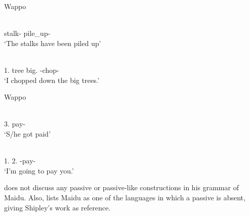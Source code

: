 \begin{exe}\ex\label{WapPass1} {Wappo}  \citep[79, 40]{Thompsonetal:2006}\nopagebreak[4]
\begin{xlist}
\ex\gll{} \\
stalk-\nom{} pile\_up-\pass{}\\
`The stalks have been piled up'

\ex\gll \textbf{}   \\
1\sg{}.\nom{} tree big.\pl{} \dir{}-chop-\pst{}\\
`I chopped down the big trees.'
\end{xlist}
\end{exe}

\begin{exe}\ex\label{WapPass2} {Wappo}  \citep[79, 46]{Thompsonetal:2006}\nopagebreak[4]
\begin{xlist}
\ex\gll{} \\
3\sg{}.\nom{} pay-\pass{}\\
`S/he got paid'

\ex\gll \textbf{}  \\
1\sg{}.\nom{} 2\sg{}.\acc{} \uop{}-pay-\fut{}\\
`I'm going to pay you.' %
\end{xlist}
\end{exe}




\citet{Shipley:1964} does not discuss any passive or passive-like constructions in his grammar of Maidu. 
Also, \citet{WALS107} lists Maidu as one of the languages in which a passive is absent, giving Shipley's work as reference. 

